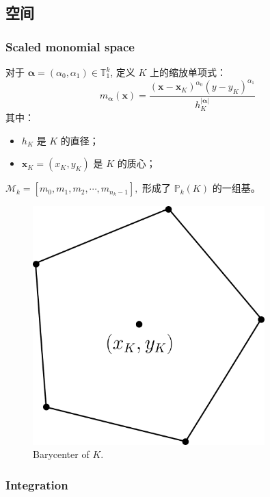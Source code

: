 \documentclass[aspectratio=169,serif]{beamer}
\begin{document}
\subsection{空间}
\begin{frame}
\frametitle{Scaled monomial space}
\begin{minipage}[b]{0.55\linewidth}
对于 $\boldsymbol{\alpha} = (\alpha_0, \alpha_1) \in \mathbb{T}_1^k$, 
定义 $K$ 上的缩放单项式：
$$
m_{\boldsymbol{\alpha}}(\boldsymbol{x}) = \frac{(\boldsymbol{x} - \boldsymbol{x}_K)^{\alpha_0}(y -
y_K)^{\alpha_1}}{h_K^{|\boldsymbol{\alpha}|}}
$$
其中：
\begin{itemize}
    \item $h_K$ 是 $K$ 的直径； 
    \item $\boldsymbol{x}_K = (x_K, y_K)$ 是 $K$ 的质心；
\end{itemize}
$\mathcal{M}_k = [m_0, m_1, m_2, \cdots, m_{n_k-1}], $
形成了 $\mathbb{P}_k(K)$ 的一组基。
\end{minipage}
\hfill
\begin{minipage}[b]{0.4\linewidth}
    \centering
    \begin{figure}[htpb]
        \centering
        \includegraphics[width=0.8\textwidth]{../figures/polygon_K.png}
        \caption{Barycenter of $K$.}
    \end{figure}
\end{minipage}
\end{frame}

\begin{frame}
  \frametitle{Integration}
\end{frame}
\end{document}

